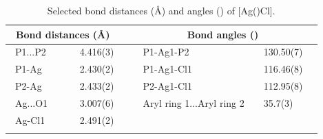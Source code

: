 \begin{table}[htbp]
\caption[Selected bond distances and angles of [Ag(\tButhixantphos)Cl{]}]{Selected bond distances (\AA) and angles (\degrees) of [Ag(\tButhixantphos)Cl].}
\vspace{1em}
\label{table:crystalthixantphossilverchloride:lengths}
\small
\begin{center}
\begin{tabular}{l l l l}
	\toprule
	\multicolumn{2}{l}{\bfseries{~Bond distances (\si{\angstrom})}} & \multicolumn{2}{c}{\bfseries{Bond angles (\degrees)}} \\
	\midrule		
	~P1...P2		~~&~~4.416(3)~~	&~~P1-Ag1-P2			&~~130.50(7)~~	\\	
	~P1-Ag		~~&~~2.430(2)~~	&~~P1-Ag1-Cl1			&~~116.46(8)~~	\\
	~P2-Ag		~~&~~2.433(2)~~	&~~P2-Ag1-Cl1			&~~112.95(8)~~	\\
	~Ag...O1		~~&~~3.007(6)~~	&~~Aryl ring 1...Aryl ring 2		&~~35.7(3)~~		\\
	~Ag-Cl1		~~&~~2.491(2)~~	&~~					&~~		~~		\\
	\bottomrule{}
\end{tabular}
\end{center}
\end{table}

